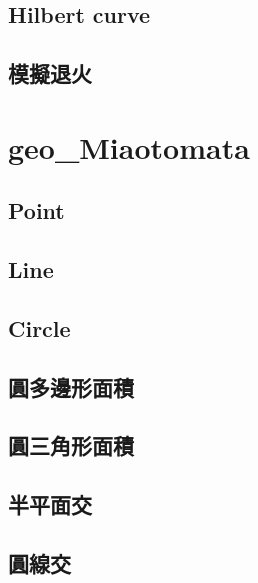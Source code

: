 \documentclass[a4paper,10pt,twocolumn,oneside]{article}
\begin{document}
\subsection{Hilbert curve}

\subsection{模擬退火}
   
\section{geo_Miaotomata}
    \subsection{Point}
    

    \subsection{Line}
    

    \subsection{Circle}
    

    \subsection{圓多邊形面積}
    

    \subsection{圓三角形面積}
    

    \subsection{半平面交}
    

    \subsection{圓線交}
    
\end{document}
